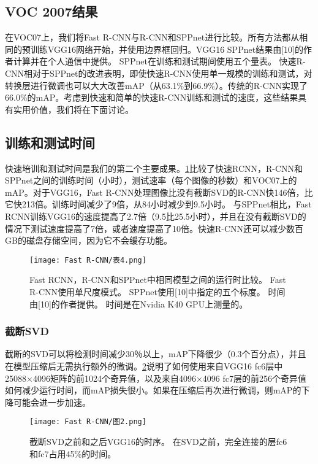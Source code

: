 \subsection{VOC 2007结果}
\par 在VOC07上，我们将Fast R-CNN与R-CNN和SPPnet进行比较。所有方法都从相同的预训练VGG16网络开始，并使用边界框回归。VGG16 SPPnet结果由[10]的作者计算并在个人通信中提供。 SPPnet在训练和测试期间使用五个量表。 快速R-CNN相对于SPPnet的改进表明，即使快速R-CNN使用单一规模的训练和测试，对转换层进行微调也可以大大改善mAP（从63.1\%到66.9\%）。传统的R-CNN实现了66.0\%的mAP。考虑到快速和简单的快速R-CNN训练和测试的速度，这些结果具有实用价值，我们将在下面讨论。

\subsection{训练和测试时间}
\par 快速培训和测试时间是我们的第二个主要成果。\ref{表4}比较了快速RCNN，R-CNN和SPPnet之间的训练时间（小时），测试速率（每个图像的秒数）和VOC07上的mAP。对于VGG16，Fast R-CNN处理图像比没有截断SVD的R-CNN快146倍，比它快213倍。训练时间减少了9倍，从84小时减少到9.5小时。 与SPPnet相比，Fast RCNN训练VGG16的速度提高了2.7倍（9.5比25.5小时），并且在没有截断SVD的情况下测试速度提高了7倍，或者速度提高了10倍。快速R-CNN还可以减少数百GB的磁盘存储空间，因为它不会缓存功能。

\begin{figure}[h]
    \centering
    \texttt{[image: Fast R-CNN/表4.png]}
    \caption{Fast RCNN，R-CNN和SPPnet中相同模型之间的运行时比较。 Fast R-CNN使用单尺度模式。 SPPnet使用[10]中指定的五个标度。 时间由[10]的作者提供。 时间是在Nvidia K40 GPU上测量的。}
    \label{表4}
\end{figure}
\subsubsection{截断SVD}
\par 截断的SVD可以将检测时间减少30％以上，mAP下降很少（0.3个百分点），并且在模型压缩后无需执行额外的微调。\ref{图2}说明了如何使用来自VGG16 fc6层中25088×4096矩阵的前1024个奇异值，以及来自4096×4096 fc7层的前256个奇异值如何减少运行时间，而mAP损失很小。如果在压缩后再次进行微调，则mAP的下降可能会进一步加速。

\begin{figure}[h]
    \centering
    \texttt{[image: Fast R-CNN/图2.png]}
    \caption{截断SVD之前和之后VGG16的时序。 在SVD之前，完全连接的层fc6和fc7占用45\%的时间。}
    \label{图2}
\end{figure}

